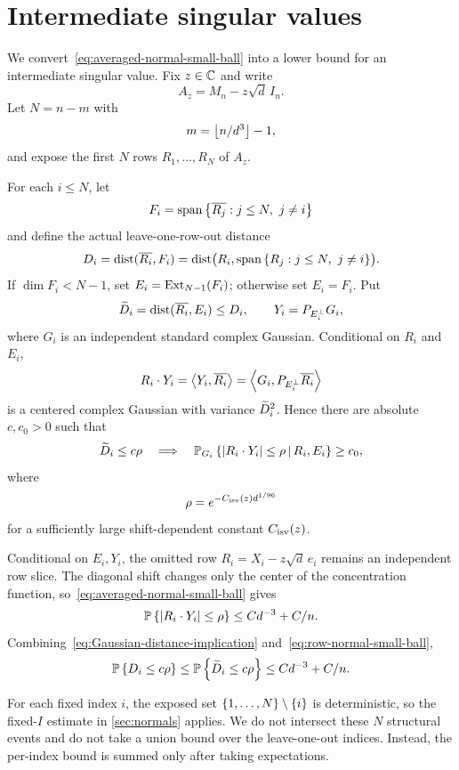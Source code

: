 \section{Intermediate singular values}\label{sec:intermediate}

We convert~\eqref{eq:averaged-normal-small-ball} into a lower bound for an intermediate singular value. Fix $z\in\mathbb C$ and write
\[
  A_z=M_n-z\sqrt d\,I_n.
\]
Let $N=n-m$ with
\[
  m=\left\lfloor n/d^3\right\rfloor-1,
\]
and expose the first $N$ rows $R_1,\ldots,R_N$ of $A_z$.

For each $i\le N$, let
\[
  F_i=\operatorname{span}\left\{\overline{R_j}:j\le N,\ j\ne i\right\}
\]
and define the actual leave-one-row-out distance
\[
  D_i=\operatorname{dist}(\overline{R_i},F_i)
  =\operatorname{dist}\bigl(R_i,\operatorname{span}\left\{R_j:j\le N,\ j\ne i\right\}\bigr).
\]
If $\dim F_i<N-1$, set $E_i=\operatorname{Ext}_{N-1}(F_i)$; otherwise set $E_i=F_i$. Put
\[
  \widetilde D_i=\operatorname{dist}(\overline{R_i},E_i)\le D_i,
  \qquad
  Y_i=P_{E_i^\perp}G_i,
\]
where $G_i$ is an independent standard complex Gaussian. Conditional on $R_i$ and $E_i$,
\[
  R_i\cdot Y_i
  =\left\langle Y_i,\overline{R_i}\right\rangle
  =\left\langle G_i,P_{E_i^\perp}\overline{R_i}\right\rangle
\]
is a centered complex Gaussian with variance $\widetilde D_i^2$. Hence there are absolute $c,c_0>0$ such that
\begin{equation}\label{eq:Gaussian-distance-implication}
  \widetilde D_i\le c\rho
  \quad\Longrightarrow\quad
  \mathbb P_{G_i}\left\{|R_i\cdot Y_i|\le\rho\,\middle|\, R_i,E_i\right\}\ge c_0,
\end{equation}
where
\[
  \rho=e^{-C_{\mathrm{isv}}(z)d^{1/96}}
\]
for a sufficiently large shift-dependent constant $C_{\mathrm{isv}}(z)$.

Conditional on $E_i,Y_i$, the omitted row $R_i=X_i-z\sqrt d\,e_i$ remains an independent row slice. The diagonal shift changes only the center of the concentration function, so~\eqref{eq:averaged-normal-small-ball} gives
\begin{equation}\label{eq:row-normal-small-ball}
  \mathbb P\left\{|R_i\cdot Y_i|\le\rho\right\}\le Cd^{-3}+C/n.
\end{equation}
Combining~\eqref{eq:Gaussian-distance-implication} and~\eqref{eq:row-normal-small-ball},
\begin{equation}\label{eq:leave-one-out-distance-prob}
  \mathbb P\left\{D_i\le c\rho\right\}
  \le\mathbb P\left\{\widetilde D_i\le c\rho\right\}
  \le Cd^{-3}+C/n.
\end{equation}

For each fixed index $i$, the exposed set $\left\{1,\ldots,N\right\}\setminus\left\{i\right\}$ is deterministic, so the fixed-$I$ estimate in 
\cref{sec:normals} applies. We do not intersect these $N$ structural events and do not take a union bound over the leave-one-out indices. Instead, the per-index bound is summed only after taking expectations.

